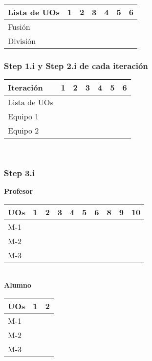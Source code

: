 \noindent
\begin{tabular}{| l | c | c | c | c | c | c |}
  \hline                       
  Lista de UOs & 1 & 2 & 3 & 4 & 5 & 6 \\
  \hline  
  Fusión &  & &  &  &  &   \\
  \hline  
  División &  &  &  &  &  &  \\
  \hline  
\end{tabular}

\subsubsection{Step 1.i y Step 2.i de cada iteración}
\label{dgp:hoja-de-gestion:b}

\noindent
\begin{tabular}{| l | c | c | c | c | c | c |}
  \hline                       
  Iteración & 1 & 2 & 3 & 4 & 5 & 6 \\
  \hline  
  Lista de UOs &  & &  &  &  &   \\
  \hline  
  Equipo 1 &  &  &  &  &  &  \\
  \hline  
  Equipo 2 &  &  &  &  &  &  \\
  \hline  
\end{tabular}\\

\subsubsection{Step 3.i}
\label{dgp:hoja-de-gestion:c}

\textbf{Profesor}\\

\noindent
\begin{tabular}{| l | c | c | c | c | c | c | c | c | c |}
  \hline                       
  UOs & 1 & 2 & 3 & 4 & 5 & 6 & 8 & 9 & 10 \\
  \hline  
  M-1 &  & &  &  &  &  &  &  &   \\
  \hline  
  M-2 &  & &  &  &  &  &  &  &   \\
  \hline  
  M-3 &  & &  &  &  &  &  &  &   \\
  \hline  
\end{tabular}\\

\textbf{Alumno}\\

\noindent
\begin{tabular}{| l | c | c |}
  \hline                       
  UOs & 1 & 2 \\
  \hline  
  M-1 &  & \\
  \hline  
  M-2 &  & \\
  \hline  
  M-3 &  & \\
  \hline  
\end{tabular}\\
